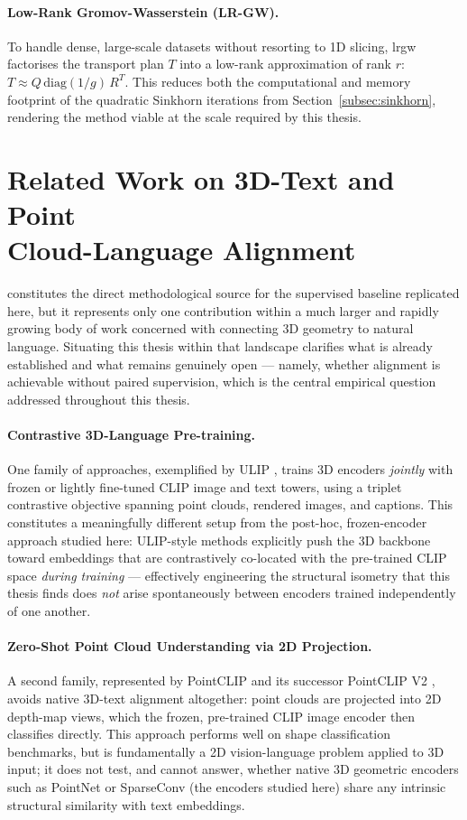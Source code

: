 \paragraph{Low-Rank Gromov-Wasserstein (LR-GW).}
To handle dense, large-scale datasets without resorting to 1D slicing, \gls{lrgw} factorises the transport plan $T$ into a low-rank approximation of rank $r$: $T \approx Q \, \mathrm{diag}(1/g) \, R^T$. This reduces both the computational and memory footprint of the quadratic Sinkhorn iterations from Section~\ref{subsec:sinkhorn}, rendering the method viable at the scale required by this thesis.

\section{Related Work on 3D-Text and Point \\ Cloud-Language Alignment}
\label{sec:related_3dtext}

\textcite{hadgi2025escaping} constitutes the direct methodological source for the supervised baseline replicated here, but it represents only one contribution within a much larger and rapidly growing body of work concerned with connecting 3D geometry to natural language. Situating this thesis within that landscape clarifies what is already established and what remains genuinely open --- namely, whether alignment is achievable without paired supervision, which is the central empirical question addressed throughout this thesis.

\paragraph{Contrastive 3D-Language Pre-training.}
One family of approaches, exemplified by ULIP \cite{xue2023ulip}, trains 3D encoders \emph{jointly} with frozen or lightly fine-tuned CLIP image and text towers, using a triplet contrastive objective spanning point clouds, rendered images, and captions. This constitutes a meaningfully different setup from the post-hoc, frozen-encoder approach studied here: ULIP-style methods explicitly push the 3D backbone toward embeddings that are contrastively co-located with the pre-trained CLIP space \emph{during training} --- effectively engineering the structural isometry that this thesis finds does \emph{not} arise spontaneously between encoders trained independently of one another.

\paragraph{Zero-Shot Point Cloud Understanding via 2D Projection.}
A second family, represented by PointCLIP \cite{zhang2022pointclip} and its successor PointCLIP V2 \cite{zhu2023pointclip}, avoids native 3D-text alignment altogether: point clouds are projected into 2D depth-map views, which the frozen, pre-trained CLIP image encoder then classifies directly. This approach performs well on shape classification benchmarks, but is fundamentally a 2D vision-language problem applied to 3D input; it does not test, and cannot answer, whether native 3D geometric encoders such as PointNet or SparseConv (the encoders studied here) share any intrinsic structural similarity with text embeddings.

